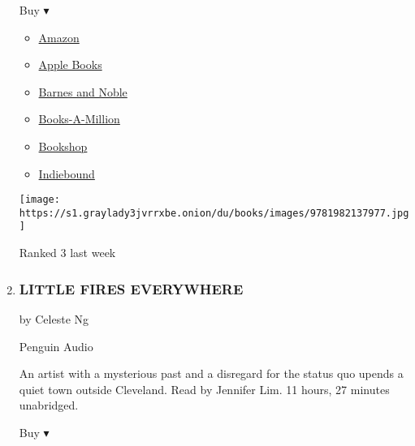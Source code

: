 \begin{enumerate}
  Buy ▾

  \begin{itemize}
  \tightlist
  \item
    \href{https://www.amazon.com/dp/1982137975?tag=NYTBSREV-20\&tag=NYTBS-20}{Amazon}
  \item
    \href{https://du-gae-books-dot-nyt-du-prd.appspot.com/buy?title=IF+IT+BLEEDS\&author=Stephen+King}{Apple
    Books}
  \item
    \href{https://www.anrdoezrs.net/click-7990613-11819508?url=https\%3A\%2F\%2Fwww.barnesandnoble.com\%2Fw\%2F\%3Fean\%3D9781797104805}{Barnes
    and Noble}
  \item
    \href{https://www.anrdoezrs.net/click-7990613-35140?url=https\%3A\%2F\%2Fwww.booksamillion.com\%2Fp\%2FIF\%2BIT\%2BBLEEDS\%2FStephen\%2BKing\%2F9781797104805}{Books-A-Million}
  \item
    \href{https://bookshop.org/a/3546/9781797104805}{Bookshop}
  \item
    \href{https://www.indiebound.org/book/9781797104805?aff=NYT}{Indiebound}
  \end{itemize}

  \texttt{[image: https://s1.graylady3jvrrxbe.onion/du/books/images/9781982137977.jpg]}

  Ranked 3 last week
\item
  \href{https://www.nytimes3xbfgragh.onion/2017/09/25/books/review/little-fires-everywhere-celeste-ng.html}{}

  \hypertarget{little-fires-everywhere}{%
  \subsubsection{LITTLE FIRES
  EVERYWHERE}\label{little-fires-everywhere}}

  by Celeste Ng

  Penguin Audio

  An artist with a mysterious past and a disregard for the status quo
  upends a quiet town outside Cleveland. Read by Jennifer Lim. 11 hours,
  27 minutes unabridged.

  Buy ▾


\end{enumerate}
